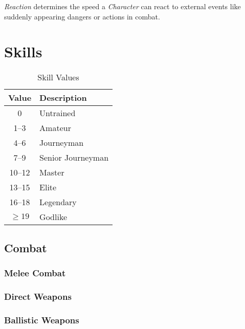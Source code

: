 \emph{Reaction} determines the speed a \emph{Character} can react to external
events like suddenly appearing dangers or actions in combat.


\section{Skills}

\begin{table}[htb]
    \caption[Skill Values]{Skill Values}
    \label{tab:skill values}
    \centering
    \begin{tabular}{cl}
        \toprule
        \textbf{Value} & \textbf{Description} \\
        \midrule
        0              & Untrained            \\
        1--3           & Amateur              \\
        4--6           & Journeyman           \\
        7--9           & Senior Journeyman    \\
        10--12         & Master               \\
        13--15         & Elite                \\
        16--18         & Legendary            \\
        \( \ge 19 \)   & Godlike              \\
        \bottomrule
    \end{tabular}
\end{table}

\subsection{Combat}

\subsubsection{Melee Combat}

\subsubsection{Direct Weapons}

\subsubsection{Ballistic Weapons}

